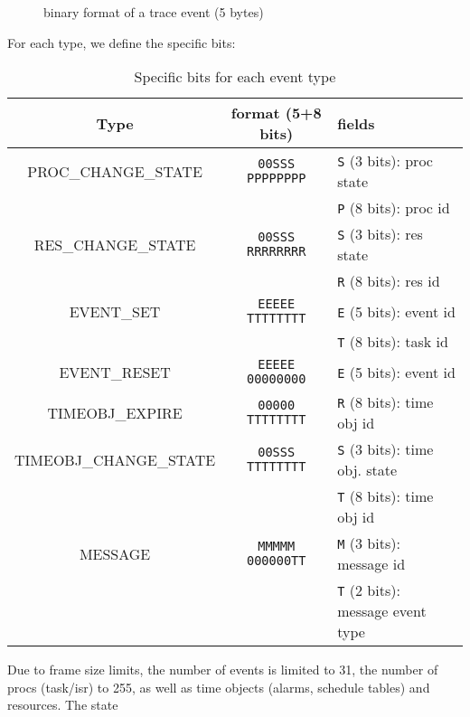 \begin{figure}[htbp]
    \centering
	\begin{adjustbox}{width=.8\linewidth,keepaspectratio}
		
	\end{adjustbox}
	\caption{binary format of a trace event (5 bytes)}
	\label{fig:traceBin}
\end{figure}

For each type, we define the specific bits:

\begin{table}[htbp]
	\begin{longtable}[c]{c|c|l}
		\bf Type & \bf format (5+8 bits) & \bf fields \\ \hline
		PROC\_CHANGE\_STATE    & \texttt{00SSS PPPPPPPP}& \texttt{S} (3 bits): proc state \\
		                       &                        & \texttt{P} (8 bits): proc id    \\ \hline
		RES\_CHANGE\_STATE     & \texttt{00SSS RRRRRRRR}& \texttt{S} (3 bits): res state  \\
		                       &                        & \texttt{R} (8 bits): res id     \\ \hline
		EVENT\_SET             & \texttt{EEEEE TTTTTTTT}& \texttt{E} (5 bits): event id   \\
		                       &                        & \texttt{T} (8 bits): task id     \\ \hline
		EVENT\_RESET           & \texttt{EEEEE 00000000}& \texttt{E} (5 bits): event id   \\ \hline
		TIMEOBJ\_EXPIRE        & \texttt{00000 TTTTTTTT}& \texttt{R} (8 bits): time obj id    \\ \hline
		TIMEOBJ\_CHANGE\_STATE & \texttt{00SSS TTTTTTTT}& \texttt{S} (3 bits): time obj. state \\
		                       &                        & \texttt{T} (8 bits): time obj id    \\ \hline
		MESSAGE & \texttt{MMMMM 000000TT}& \texttt{M} (3 bits): message id \\
	&                        & \texttt{T} (2 bits): message event type   \\ \hline        
	\end{longtable}
	\caption{Specific bits for each event type}
	\label{tab:traceBin}
\end{table}


Due to frame size limits, the number of events is limited to 31, the number of procs (task/isr) to 255, as well as time objects (alarms, schedule tables) and resources.
The state 

